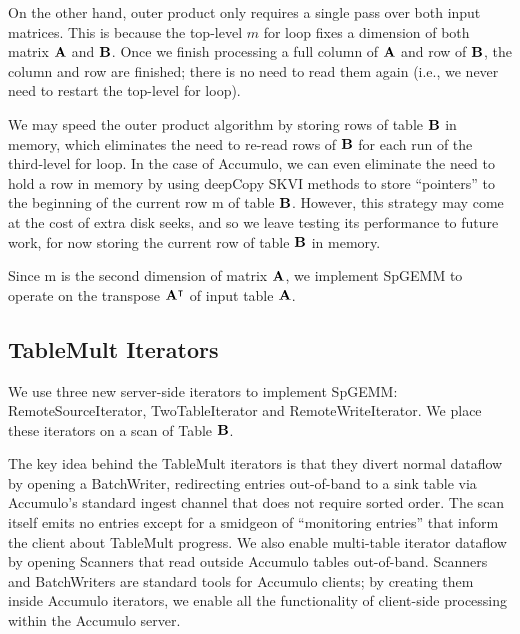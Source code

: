 On the other hand, outer product only requires a single pass over both input matrices.
This is because the top-level $m$ for loop fixes a dimension of both matrix $\mathbf{A}$ and $\mathbf{B}$.
Once we finish processing a full column of $\mathbf{A}$ and row of $\mathbf{B}$, the column and row are finished;
there is no need to read them again (i.e., we never need to restart the top-level for loop).

We may speed the outer product algorithm by storing rows of table $\mathbf{B}$ in memory,
which eliminates the need to re-read rows of $\mathbf{B}$ for each run of the third-level for loop.
In the case of Accumulo, we can even eliminate the need to hold a row in memory by using
deepCopy SKVI methods to store ``pointers'' to the beginning of the current row m of table $\mathbf{B}$.
However, this strategy may come at the cost of extra disk seeks, and so
we leave testing its performance to future work, for now storing the current row of table $\mathbf{B}$ in memory.

Since m is the second dimension of matrix $\mathbf{A}$, we implement 
SpGEMM to operate on the transpose $\mathbf{A^{\intercal}}$ of input table $\mathbf{A}$.



\subsection{TableMult Iterators}
We use three new server-side iterators to implement SpGEMM: 
RemoteSourceIterator, TwoTableIterator and RemoteWriteIterator.
We place these iterators on a scan of Table $\mathbf{B}$. 

The key idea behind the TableMult iterators is that they divert normal dataflow by opening a BatchWriter,
redirecting entries out-of-band to a sink table via %
Accumulo's standard ingest channel that does not require sorted order. 
The scan itself emits no entries except for a smidgeon of ``monitoring entries'' 
that inform the client about TableMult progress.
We also enable multi-table iterator dataflow by opening Scanners 
that read outside Accumulo tables out-of-band.
Scanners and BatchWriters are standard tools for Accumulo clients; 
by creating them inside Accumulo iterators, we enable all the functionality of client-side processing 
within the Accumulo server.

